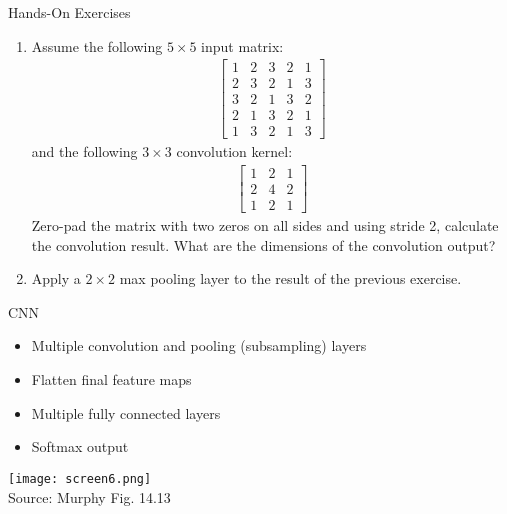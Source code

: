 \documentclass[ignorenonframetext,xcolor=x11names]{beamer}
\begin{document}
\begin{frame}{Hands-On Exercises}
\small
\begin{enumerate}
\item Assume the following $5 \times 5$ input matrix:
\begin{align*}
\begin{bmatrix} 1 & 2 & 3 & 2 & 1 \\ 
                2 & 3 & 2 & 1 & 3 \\ 
                3 & 2 & 1 & 3 & 2 \\
                2 & 1 & 3 & 2 & 1 \\               
                1 & 3 & 2 & 1 & 3 
\end{bmatrix}
\end{align*}
and the following $3 \times 3$ convolution kernel:
\begin{align*}
\begin{bmatrix}  1 & 2 & 1 \\ 
                2 & 4 & 2 \\
                1 & 2 & 1 \end{bmatrix}
\end{align*}
Zero-pad the matrix with two zeros on all sides and using stride 2, calculate the convolution result. What are the dimensions of the convolution output?

\item Apply a $2 \times 2$ max pooling layer to the result of the previous exercise. 
\end{enumerate}
\end{frame}




\begin{frame}{CNN}
\begin{itemize}
   \item Multiple convolution and pooling (subsampling) layers
   \item Flatten final feature maps
   \item Multiple fully connected layers
   \item Softmax output
\end{itemize}
\vspace{\baselineskip}
\centering
\texttt{[image: screen6.png]} \\

\scriptsize Source: Murphy Fig. 14.13
\end{frame}
\end{document}
